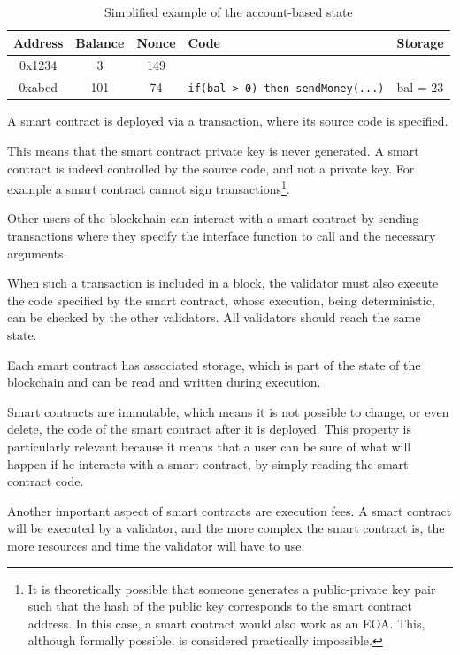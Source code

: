 \documentclass[12pt]{article}
\begin{document}
\begin{table}[ht]
    \centering
    \begin{tabular}{|c|c|c|l|l|}
        \hline
        \textbf{Address} & \textbf{Balance} & \textbf{Nonce} & \textbf{Code} & \textbf{Storage} \\
        \hline
        0x1234 & 3 & 149 & & \\        
        0xabcd & 101 & 74 & \verb|if(bal > 0) then sendMoney(...)| & bal = 23 \\
        \hline       
    \end{tabular}
    \caption{Simplified example of the account-based state}
    \label{table:account_based_state}
\end{table}

A smart contract is deployed via a transaction, where its source code is specified.

This means that the smart contract private key is never generated. A smart contract is indeed controlled by the source code, and not a private key. For example a smart contract cannot sign transactions\footnote{It is theoretically possible that someone generates a public-private key pair such that the hash of the public key corresponds to the smart contract address. In this case, a smart contract would also work as an EOA. This, although formally possible, is considered practically impossible.}.

Other users of the blockchain can interact with a smart contract by sending transactions where they specify the interface function to call and the necessary arguments.

When such a transaction is included in a block, the validator must also execute the code specified by the smart contract, whose execution, being deterministic, can be checked by the other validators. All validators should reach the same state.

Each smart contract has associated storage, which is part of the state of the blockchain and can be read and written during execution.

Smart contracts are immutable, which means it is not possible to change, or even delete, the code of the smart contract after it is deployed. 
This property is particularly relevant because it means that a user can be sure of what will happen if he interacts with a smart contract, by simply reading the smart contract code.

Another important aspect of smart contracts are execution fees. A smart contract will be executed by a validator, and the more complex the smart contract is, the more resources and time the validator will have to use.
\end{document}
